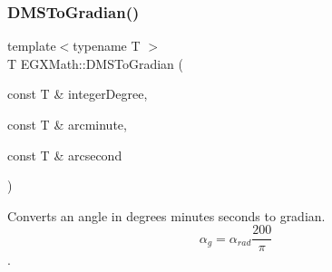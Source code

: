\mbox{\label{group___e_g_x_math-_angle_conversions-_d_m_s_ga2abca0654499b46df6ab9592f95b9ef1}} 
\subsubsection{\texorpdfstring{D\+M\+S\+To\+Gradian()}{DMSToGradian()}}
{\footnotesize\ttfamily template$<$typename T $>$ \\
T E\+G\+X\+Math\+::\+D\+M\+S\+To\+Gradian (\begin{DoxyParamCaption}\item[{const T \&}]{integer\+Degree,  }\item[{const T \&}]{arcminute,  }\item[{const T \&}]{arcsecond }\end{DoxyParamCaption})}



Converts an angle in degrees minutes seconds to gradian. \[\alpha_{g}=\alpha_{rad}\frac{200}{\pi}\]. 


